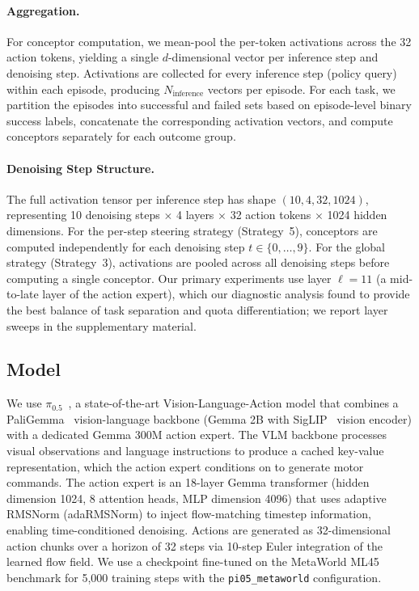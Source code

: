 \paragraph{Aggregation.}
For conceptor computation, we mean-pool the per-token activations across the 32 action tokens, yielding a single $d$-dimensional vector per inference step and denoising step. Activations are collected for every inference step (policy query) within each episode, producing $N_{\text{inference}}$ vectors per episode. For each task, we partition the episodes into successful and failed sets based on episode-level binary success labels, concatenate the corresponding activation vectors, and compute conceptors separately for each outcome group.

\paragraph{Denoising Step Structure.}
The full activation tensor per inference step has shape $(10, 4, 32, 1024)$, representing 10 denoising steps $\times$ 4 layers $\times$ 32 action tokens $\times$ 1024 hidden dimensions. For the per-step steering strategy (Strategy~5), conceptors are computed independently for each denoising step $t \in \{0, \ldots, 9\}$. For the global strategy (Strategy~3), activations are pooled across all denoising steps before computing a single conceptor. Our primary experiments use layer $\ell = 11$ (a mid-to-late layer of the action expert), which our diagnostic analysis found to provide the best balance of task separation and quota differentiation; we report layer sweeps in the supplementary material.


\subsection{Model}
\label{sec:model}

We use $\pi_{0.5}$\xspace~\citep{black2024pi0}, a state-of-the-art Vision-Language-Action model that combines a PaliGemma~\citep{beyer2024paligemma} vision-language backbone (Gemma 2B with SigLIP~\citep{zhai2023sigmoid} vision encoder) with a dedicated Gemma 300M action expert. The VLM backbone processes visual observations and language instructions to produce a cached key-value representation, which the action expert conditions on to generate motor commands. The action expert is an 18-layer Gemma transformer (hidden dimension 1024, 8 attention heads, MLP dimension 4096) that uses adaptive RMSNorm (adaRMSNorm) to inject flow-matching timestep information, enabling time-conditioned denoising. Actions are generated as 32-dimensional action chunks over a horizon of 32 steps via 10-step Euler integration of the learned flow field. We use a checkpoint fine-tuned on the MetaWorld ML45 benchmark for 5{,}000 training steps with the \texttt{pi05\_metaworld} configuration.


